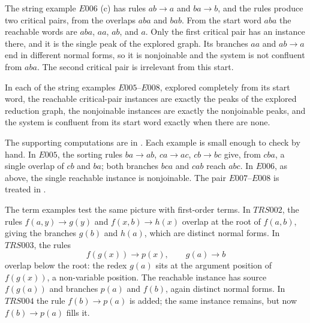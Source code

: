 \begin{table}[t]
    \caption{Critical pairs computed from the rules (``system''), reachable critical-pair instances, peaks in the explored reduction graph, and nonjoinable reachable instances. In every example the explored graph is complete, and the reachable instances coincide with the peaks.}
    \label{tab:system-vs-reachable-cp-vs-graph-peak}
    \centering
    \smallskip
    
\end{table}

The string example $E006$ (c) has rules $ab \to a$ and $ba \to b$, and the rules produce two critical pairs, from the overlaps $aba$ and $bab$. From the start word $aba$ the reachable words are $aba$, $aa$, $ab$, and $a$. Only the first critical pair has an instance there, and it is the single peak of the explored graph. Its branches $aa$ and $ab \to a$ end in different normal forms, so it is nonjoinable and the system is not confluent from $aba$. The second critical pair is irrelevant from this start.

\begin{observation}
\label{prop:reachable-critical-pairs-capture-string-obstructions}
In each of the string examples $E005$--$E008$, explored completely from its start word, the reachable critical-pair instances are exactly the peaks of the explored reduction graph, the nonjoinable instances are exactly the nonjoinable peaks, and the system is confluent from its start word exactly when there are none.
\end{observation}

The supporting computations are in . Each example is small enough to check by hand. In $E005$, the sorting rules $ba \to ab$, $ca \to ac$, $cb \to bc$ give, from $cba$, a single overlap of $cb$ and $ba$; both branches $bca$ and $cab$ reach $abc$. In $E006$, as above, the single reachable instance is nonjoinable. The pair $E007$--$E008$ is treated in .

The term examples test the same picture with first-order terms. In $TRS002$, the rules $f(a,y) \to g(y)$ and $f(x,b) \to h(x)$ overlap at the root of $f(a,b)$, giving the branches $g(b)$ and $h(a)$, which are distinct normal forms. In $TRS003$, the rules
\[
f(g(x)) \to p(x), \qquad g(a) \to b
\]
overlap below the root: the redex $g(a)$ sits at the argument position of $f(g(x))$, a non-variable position. The reachable instance has source $f(g(a))$ and branches $p(a)$ and $f(b)$, again distinct normal forms. In $TRS004$ the rule $f(b) \to p(a)$ is added; the same instance remains, but now $f(b) \to p(a)$ fills it.

